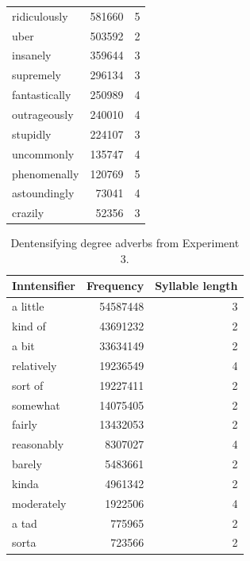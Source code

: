 \documentclass[10pt,letterpaper]{article}
\begin{document}
\begin{table}[!ht]
\begin{center}
\begin{tabular}{lrr}
      ridiculously & 581660 & 5 \\ 
      uber & 503592 & 2 \\ 
      insanely & 359644 & 3 \\ 
      supremely & 296134 & 3 \\ 
      fantastically & 250989 & 4 \\ 
      outrageously & 240010 & 4 \\ 
      stupidly & 224107 & 3 \\ 
      uncommonly & 135747 & 4 \\ 
      phenomenally & 120769 & 5 \\ 
      astoundingly & 73041 & 4 \\ 
      crazily & 52356 & 3 \\
      \hline
      \end{tabular} 
      \end{center} 
      \end{table}
      
      \begin{table}[!ht]
      \begin{center} 
      \caption{Dentensifying degree adverbs from Experiment 3.} 
      \label{deintensifiers-exp3-table} 
      \vskip 0.12in
      \begin{tabular}{lrr} 
      \hline
      Inntensifier &  Frequency & Syllable length \\
      \hline
      a little & 54587448 & 3 \\ 
      kind of & 43691232 & 2 \\ 
      a bit & 33634149 & 2 \\ 
      relatively & 19236549 & 4 \\ 
      sort of & 19227411 & 2 \\ 
      somewhat & 14075405 & 2 \\ 
      fairly & 13432053 & 2 \\ 
      reasonably & 8307027 & 4 \\ 
      barely & 5483661 & 2 \\ 
      kinda & 4961342 & 2 \\ 
      moderately & 1922506 & 4 \\ 
      a tad & 775965 & 2 \\ 
      sorta & 723566 & 2 \\ 
      \hline
      \end{tabular} 
      \end{center} 
      \end{table}

\end{document}
